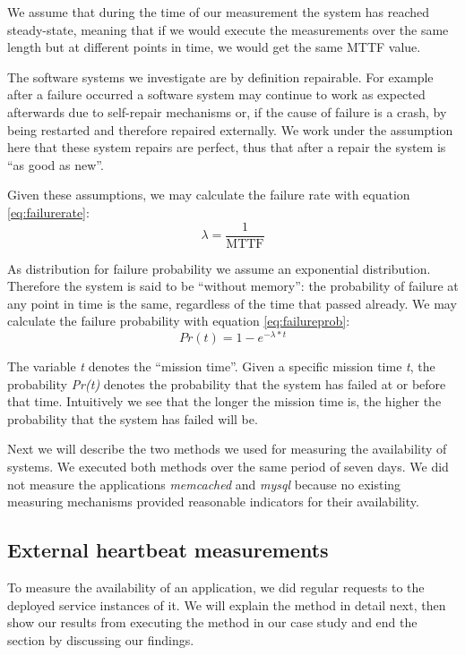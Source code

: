 We assume that during the time of our measurement the system has reached steady-state, meaning that if we would execute the measurements over the same length but at different points in time, we would get the same MTTF value.

The software systems we investigate are by definition repairable. For example after a failure occurred a software system may continue to work as expected afterwards due to self-repair mechanisms or, if the cause of failure is a crash, by being restarted and therefore repaired externally. We work under the assumption here that these system repairs are perfect, thus that after a repair the system is ``as good as new''.

Given these assumptions, we may calculate the failure rate with equation \ref{eq:failurerate}:
\begin{equation} \label{eq:failurerate}
  \lambda = \frac{1}{\operatorname{MTTF}}
\end{equation}

As distribution for failure probability we assume an exponential distribution. Therefore the system is said to be ``without memory'': the probability of failure at any point in time is the same, regardless of the time that passed already. We may calculate the failure probability with equation \ref{eq:failureprob}:
\begin{equation} \label{eq:failureprob}
  Pr(t) = 1 - e^{- \lambda * t}
\end{equation}

The variable \emph{t} denotes the ``mission time''. Given a specific mission time \emph{t}, the probability \emph{Pr(t)} denotes the probability that the system has failed at or before that time. Intuitively we see that the longer the mission time is, the higher the probability that the system has failed will be.

Next we will describe the two methods we used for measuring the availability of systems. We executed both methods over the same period of seven days. We did not measure the applications \emph{memcached} and \emph{mysql} because no existing measuring mechanisms provided reasonable indicators for their availability.

\subsection{External heartbeat measurements}
\label{subsec:heartbeat_measurement}

To measure the availability of an application, we did regular requests to the deployed service instances of it. We will explain the method in detail next, then show our results from executing the method in our case study and end the section by discussing our findings.

